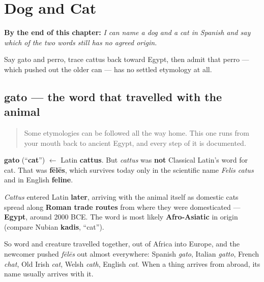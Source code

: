 
\chapter{Dog and Cat}
\label{ch:spanish-dog-and-cat}

\begin{chapteropening}
\textbf{By the end of this chapter:} \emph{I can name a dog and a cat in Spanish and say which of the two words still has no agreed origin.}

Say gato and perro, trace cattus back toward Egypt, then admit that perro — which pushed out the older can — has no settled etymology at all.
\end{chapteropening}

\section[gato]{gato — the word that travelled with the animal}

\label{lesson:ES-C32-gato}



\begin{quote}
Some etymologies can be followed all the way home. This one runs from your mouth back to ancient Egypt, and every step of it is documented.
\end{quote}

\begin{cousinweb}
\textbf{gato} (\textquotedblleft{}\textbf{cat}\textquotedblright{}) $\leftarrow$ Latin \textbf{cattus}. But \emph{cattus} was \textbf{not} Classical Latin's word for cat. That was \textbf{fēlēs}, which survives today only in the scientific name \emph{Felis catus} and in English \textbf{feline}.

\emph{Cattus} entered Latin \textbf{later}, arriving with the animal itself as domestic cats spread along \textbf{Roman trade routes} from where they were domesticated — \textbf{Egypt}, around 2000 BCE. The word is most likely \textbf{Afro-Asiatic} in origin (compare Nubian \textbf{kadis}, \textquotedblleft{}cat\textquotedblright{}).

So word and creature travelled together, out of Africa into Europe, and the newcomer pushed \emph{fēlēs} out almost everywhere: Spanish \emph{gato}, Italian \emph{gatto}, French \emph{chat}, Old Irish \emph{cat}, Welsh \emph{cath}, English \emph{cat}. When a thing arrives from abroad, its name usually arrives with it.
\end{cousinweb}

